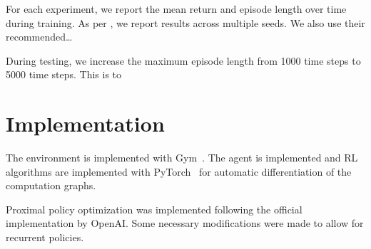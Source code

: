 For each experiment, we report the mean return and episode length over time during training.
As per \cite{agarwal_rlliable_2022}, we report results across multiple seeds.
We also use their recommended\dots

During testing, we increase the maximum episode length from 1000 time steps to 5000 time steps.
This is to 

\section{Implementation}

The environment is implemented with Gym~\cite{brockman_gym_2016}. The agent is implemented and RL algorithms are implemented with PyTorch~\cite{paszke_pytorch_nodate} for automatic differentiation of the computation graphs.

Proximal policy optimization was implemented following the official implementation by OpenAI.
Some necessary modifications were made to allow for recurrent policies.



















